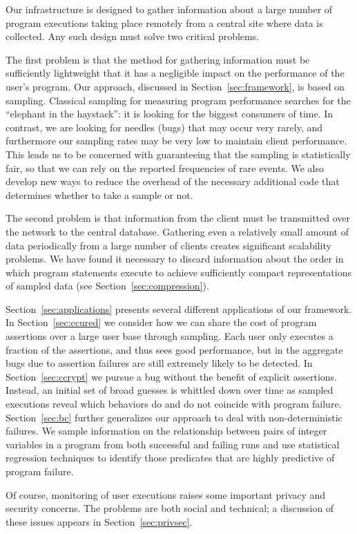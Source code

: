 Our infrastructure is designed to gather information about a large
number of program executions taking place remotely from a central site
where data is collected.  Any such design must solve two critical
problems.

The first problem is that the method for gathering information must be
sufficiently lightweight that it has a negligible impact on the
performance of the user's program.  Our approach, discussed in
Section~\ref{sec:framework}, is based on sampling.  Classical sampling
for measuring program performance searches for the ``elephant in the
haystack'': it is looking for the biggest consumers of time.  In
contrast, we are looking for needles (bugs) that may occur very
rarely, and furthermore our sampling rates may be very low to maintain
client performance.  This leads us to be concerned with guaranteeing
that the sampling is statistically fair, so that we can rely on the
reported frequencies of rare events.  We also develop new ways to
reduce the overhead of the necessary additional code that determines
whether to take a sample or not.

The second problem is that information from the client must be
transmitted over the network to the central database.  Gathering even
a relatively small amount of data periodically from a large number of
clients creates significant scalability problems.  We have found it necessary
to discard information about the order in which program statements execute
to achieve sufficiently compact representations of sampled data
(see Section~\ref{sec:compression}).

Section~\ref{sec:applications} presents several different applications
of our framework.  In Section~\ref{sec:ccured} we consider how we can
share the cost of program assertions over a large user base through
sampling.  Each user only executes a fraction of the assertions, and
thus sees good performance, but in the aggregate bugs due to assertion
failures are still extremely likely to be detected.  In
Section~\ref{sec:ccrypt} we pursue a bug without the benefit of
explicit assertions.  Instead, an initial set of broad guesses is
whittled down over time as sampled executions reveal which behaviors
do and do not coincide with program failure.  Section~\ref{sec:bc}
further generalizes our approach to deal with non-deterministic
failures.  We sample information on the relationship between pairs of
integer variables in a program from both successful and failing runs
and use statistical regression techniques to identify those predicates
that are highly predictive of program failure.


Of course, monitoring of user executions raises some important privacy
and security concerns.  The problems are both social and technical; a
discussion of these issues appears in Section~\ref{sec:privsec}.

